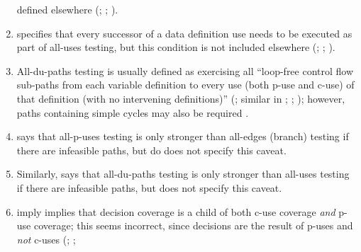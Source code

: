 \begin{enumerate}
          defined elsewhere (\citealp[p.~27]{IEEE2021c};
          \citeyear[p.~83]{IEEE2017}; \citealp[p.~479]{PetersAndPedrycz2000}).
    \item %
           specifies that every
          successor of a data definition use needs to be executed as part of
          all-uses testing, but this condition is not included elsewhere
          (\citealp[pp.~28\==29]{IEEE2021c}; \citeyear[p.~120]{IEEE2017};
          \citealp[pp.~478\==479]{PetersAndPedrycz2000}).
    \item %
          All-\acsp{du-path} testing is usually defined as exercising all
          ``loop-free control flow sub-paths from each variable definition to
          every use (both \acs{p-use} and \acs{c-use}) of that definition (with no
          intervening definitions)'' (\citealp[p.~29]{IEEE2021c}; similar in
          \citeyear[p.~125]{IEEE2017}; \citealp[p.~5\=/13]{SWEBOK2024};
          \citealp[p.~479]{PetersAndPedrycz2000}); however, paths containing
          simple cycles may also be required \citep[p.~425]{vanVliet2000}.
    \item %
           says that
          all-\acsp{p-use} testing is only stronger than all-edges (branch)
          testing if there are infeasible paths, but
          \citet[Fig.~F.1]{IEEE2021c} \ifnotpaper do
          \else does \fi not specify this caveat.
    \item %
          Similarly, \citet[pp.~432\==433]{vanVliet2000} says that
          all-\acsp{du-path} testing is only stronger than all-uses testing if
          there are infeasible paths, but \citet[p.~5\=/13]{SWEBOK2024} does
          not specify this caveat.
    \item %
          \citet[Fig.~12.31]{PetersAndPedrycz2000} \ifnotpaper imply
          \else implies \fi that decision coverage is a child of both \acs{c-use}
          coverage \emph{and} \acs{p-use} coverage; this seems incorrect, since
          decisions are the result of \acsp{p-use} and \emph{not} \acsp{c-use}
          (\citealp[pp.~5, 27]{IEEE2021c}; \citeyear[p.~332]{IEEE2017};

\end{enumerate}

